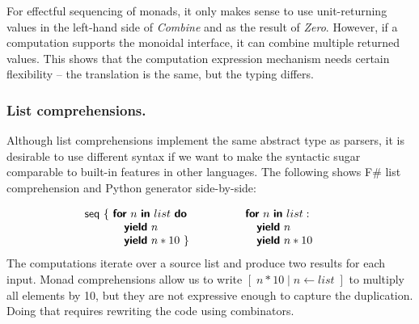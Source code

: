 \documentclass[runningheads,a4paper]{llncs}
\begin{document}
For effectful sequencing of monads, it only makes sense to use unit-returning values in the left-hand
side of \emph{Combine} and as the result of \emph{Zero}. However, if a computation supports the monoidal
interface, it can combine multiple returned values. This shows that the computation 
expression mechanism needs certain flexibility -- the translation is the same, but the typing differs.

\subsubsection{List comprehensions.} Although list comprehensions implement the same abstract type
as parsers, it is desirable to use different syntax if we want to make the syntactic sugar comparable to 
built-in features in other languages. The following shows F\# list comprehension and Python generator
side-by-side:

\begin{equation*}
\hspace{-2em}
\begin{array}{l}
\ident{seq}~\{~ \kvd{for}~n~\kvd{in}~list~\kvd{do}  \\
\hspace{3.5em}  \kvd{yield}~n          \\
\hspace{3.5em}  \kvd{yield}~n*10 ~\}
\end{array}
\qquad\qquad
\begin{array}{l}
\kvd{for}~n~\kvd{in}~list:  \\
\quad \kvd{yield}~n          \\
\quad \kvd{yield}~n*10
\end{array}
\end{equation*}
%
The computations iterate over a source list and produce two results for each input. 
Monad comprehensions \cite{monad-compre} allow us to write $[\;n*10\;|\;n\leftarrow list\;]$
to multiply all elements by 10, but they are not expressive enough to capture the duplication. 
Doing that requires rewriting the code using combinators.
\end{document}
